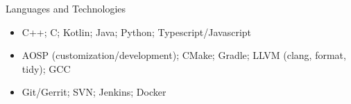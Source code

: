 \documentclass[]{mcdowellcv}
\begin{document}
	\begin{cvsection}{Languages and Technologies}
		\begin{cvsubsection}{}{}{}
			\begin{itemize}
				\item C++; C; Kotlin; Java; Python; Typescript/Javascript
				\item AOSP (customization/development); CMake; Gradle; LLVM  (clang, format, tidy); GCC
				\item Git/Gerrit; SVN; Jenkins; Docker
			\end{itemize}
		\end{cvsubsection}
	\end{cvsection}
\end{document}
